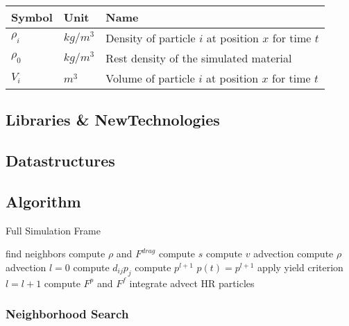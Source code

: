 \documentclass[intern]{cgMA}
\begin{document}
    \begin{center} 
        \begin{tabular}{|l|l|l|}
        \hline
        Symbol & Unit & Name \\
        \hline
        $\rho_i$ & $kg/m^3$ & Density of particle $i$ at position $x$ for time $t$ \\
        $\rho_0$ & $kg/m^3$ & Rest density of the simulated material \\
        $V_i$ & $m^3$ & Volume of particle $i$ at position $x$ for time $t$ \\
        \hline
        
        \end{tabular}
    \end{center}
    
    \subsection{Libraries \& NewTechnologies}
    
    \subsection{Datastructures}
    
    \subsection{Algorithm}
    \begin{algorithm}
        \caption{Full Simulation Frame}
        \begin{algorithmic}[1]
        \State find neighbors 
        \State compute $\rho$ and $F^{drag}$ 
        \State compute $s$ 
        \State compute $v$ advection 
        \State compute $\rho$ advection 
        \State $l = 0$
            \State compute $d_{ij}p_{j}$
            \State compute $p^{l+1}$
            \State $p(t) = p^{l+1}$
            \State apply yield criterion 
            \State $l = l+1$
        \EndWhile
        \State compute $F^p$ and $F^f$ 
        \State integrate 
        \State advect HR particles 
        \end{algorithmic}
    \end{algorithm}
    
    \subsubsection{Neighborhood Search}
    
\end{document}
